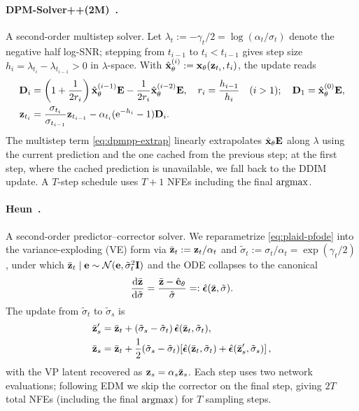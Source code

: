 \documentclass{article}
\begin{document}
\paragraph{DPM-Solver++(2M)~\citep{lu2025dpm}.} A second-order multistep solver. Let $\lambda_t := -\gamma_t/2 = \log(\alpha_t/\sigma_t)$ denote the negative half log-SNR; stepping from $t_{i-1}$ to $t_i < t_{i-1}$ gives step size $h_i = \lambda_{t_i} - \lambda_{t_{i-1}} > 0$ in $\lambda$-space. With $\hat{{\mathbf x}}_\theta^{(i)} := {\mathbf x}_\theta({\mathbf z}_{t_i}, t_i)$, the update reads
\begin{align}
{\mathbf D}_i &= \left(1 + \frac{1}{2 r_i}\right) \hat{{\mathbf x}}_\theta^{(i-1)} {\mathbf E} - \frac{1}{2 r_i} \hat{{\mathbf x}}_\theta^{(i-2)} {\mathbf E}, \quad r_i = \frac{h_{i-1}}{h_i} \quad (i > 1); \quad {\mathbf D}_1 = \hat{{\mathbf x}}_\theta^{(0)} {\mathbf E}, \label{eq:dpmpp-extrap}\\
{\mathbf z}_{t_i} &= \frac{\sigma_{t_i}}{\sigma_{t_{i-1}}} {\mathbf z}_{t_{i-1}} - \alpha_{t_i} ({\mathrm{e}}^{-h_i} - 1) {\mathbf D}_i. \label{eq:dpmpp-update}
\end{align}
The multistep term \cref{eq:dpmpp-extrap} linearly extrapolates $\hat{{\mathbf x}}_\theta {\mathbf E}$ along $\lambda$ using the current prediction and the one cached from the previous step; at the first step, where the cached prediction is unavailable, we fall back to the DDIM update. A $T$-step schedule uses $T + 1$ NFEs including the final $\operatorname*{argmax}$.

\paragraph{Heun~\citep{karras2022elucidating}.} A second-order predictor--corrector solver. We reparametrize \cref{eq:plaid-pfode} into the variance-exploding (VE) form via $\bar{{\mathbf z}}_t := {\mathbf z}_t/\alpha_t$ and $\tilde\sigma_t := \sigma_t/\alpha_t = \exp(\gamma_t/2)$, under which $\bar{{\mathbf z}}_t \mid {\mathbf e} \sim \mathcal{N}({\mathbf e}, \tilde\sigma_t^2 {\mathbf I})$ and the ODE collapses to the canonical
\begin{equation}
  \frac{{\mathrm{d}}\bar{{\mathbf z}}}{{\mathrm{d}}\tilde\sigma} = \frac{\bar{{\mathbf z}}-\hat{{\mathbf e}}_\theta}{\tilde\sigma} =: \hat{{\boldsymbol{\epsilon}}}(\bar{{\mathbf z}},\tilde\sigma).
\end{equation}
The update from $\tilde\sigma_t$ to $\tilde\sigma_s$ is
\begin{align}
  \bar{{\mathbf z}}'_s &= \bar{{\mathbf z}}_t + (\tilde\sigma_s-\tilde\sigma_t)\,\hat{{\boldsymbol{\epsilon}}}(\bar{{\mathbf z}}_t,\tilde\sigma_t),
  \label{eq:heun-ve-pred}\\
  \bar{{\mathbf z}}_s &= \bar{{\mathbf z}}_t + \frac{1}{2}(\tilde\sigma_s-\tilde\sigma_t)\!\left[\hat{{\boldsymbol{\epsilon}}}(\bar{{\mathbf z}}_t,\tilde\sigma_t)+\hat{{\boldsymbol{\epsilon}}}(\bar{{\mathbf z}}'_s,\tilde\sigma_s)\right],
  \label{eq:heun-ve-corr}
\end{align}
with the VP latent recovered as ${\mathbf z}_s = \alpha_s\bar{{\mathbf z}}_s$. Each step uses two network evaluations; following EDM we skip the corrector on the final step, giving $2T$ total NFEs (including the final $\operatorname*{argmax}$) for $T$ sampling steps.
\end{document}
